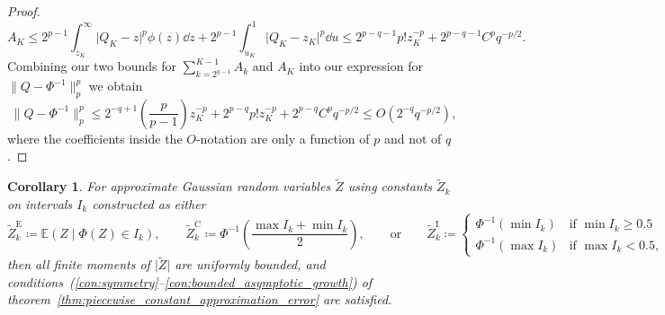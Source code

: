 \documentclass[9pt,a4paper,english]{extarticle}
\newtheorem{corollary}[theorem]{Corollary}
\begin{document}
\begin{proof}
\begin{equation*}
A_K 
\leq 2^{p-1} \int_{z_K}^{\infty} \lvert Q_K - z\rvert^p \phi(z) \dd{z} +  2^{p-1} \int_{u_K}^{1} \lvert Q_K - z_K \rvert^p \dd{u} 
\leq 2^{p-q-1} p! z_K^{-p} + 2^{p-q-1} C^p q^{-p/2}.
\end{equation*}
Combining our two bounds for $ \sum_{k=2^{q-1}}^{K-1} A_k $ and $ A_K $ into our expression for  $ \lVert Q - \Phi^{-1}\rVert_p^p $ we obtain
\begin{equation*}
\lVert Q - \Phi^{-1}\rVert_p^p 
\leq 2^{-q+1} \left(\frac{p}{p-1}\right) z_K^{-p} + 2^{p-q} p! z_K^{-p} + 2^{p-q} C^p q^{-p/2} 
\leq O(2^{-q}q^{-p/2}),
\end{equation*}
where the coefficients inside the $ O $-notation are only a function of $ p $ and not of $ q $. \qedhere
\end{proof}

\begin{corollary}
\label{cor:piecewise_constant_constructions}
For approximate Gaussian random variables $ \widetilde{Z} $ using constants $ \widetilde{Z}_k $ on intervals $ I_k $ constructed as either
\begin{equation*}
\label{eqt:approximate_normal_expected_value_construction}
\widetilde{Z}_k^\mathrm{E} \coloneqq \mathbb{E}(Z\mid \Phi(Z) \in I_k), 
\qquad 
\widetilde{Z}_k^\mathrm{C} \coloneqq {\Phi^{-1}}\left(\dfrac{\max I_k + \min I_k}{2}\right), 
\qquad \text{or} \qquad 
\widetilde{Z}_k^\mathrm{I} \coloneqq 
\begin{cases}
\Phi^{-1}(\min I_k) & \text{if } \min I_k \geq 0.5 \\
\Phi^{-1}(\max I_k) & \text{if } \max I_k < 0.5, 
\end{cases}
\end{equation*}
then all finite moments of $ \lvert\widetilde{Z}\rvert $ are uniformly bounded, and conditions~(\ref{con:symmetry}--\ref{con:bounded_asymptotic_growth}) of theorem~\ref{thm:piecewise_constant_approximation_error} are satisfied. 
\end{corollary}
\end{document}
